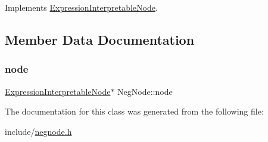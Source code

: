 Implements \hyperlink{classExpressionInterpretableNode_a43650f046c48fc539f77a207e3c9181e}{Expression\+Interpretable\+Node}.



\subsection{Member Data Documentation}
\mbox{\label{classNegNode_ac1c92a11fc98afbb953cd391d84074c2}} 
\subsubsection{\texorpdfstring{node}{node}}
{\footnotesize\ttfamily \hyperlink{classExpressionInterpretableNode}{Expression\+Interpretable\+Node}$\ast$ Neg\+Node\+::node}



The documentation for this class was generated from the following file\+:\begin{DoxyCompactItemize}
\item 
include/\hyperlink{negnode_8h}{negnode.\+h}\end{DoxyCompactItemize}
